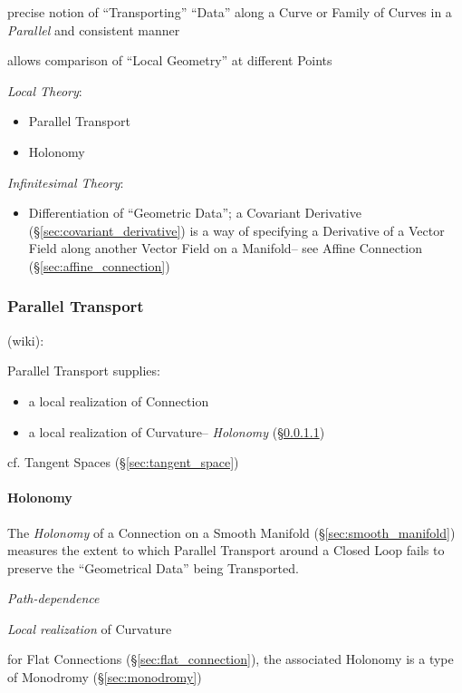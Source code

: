 \begin{itemize}
precise notion of ``Transporting'' ``Data'' along a Curve or Family of Curves
in a \emph{Parallel} and consistent manner

allows comparison of ``Local Geometry'' at different Points

\emph{Local Theory}:
\begin{itemize}
  \item Parallel Transport
  \item Holonomy
\end{itemize}

\emph{Infinitesimal Theory}:
\begin{itemize}
  \item Differentiation of ``Geometric Data''; a Covariant Derivative
    (\S\ref{sec:covariant_derivative}) is a way of specifying a Derivative of a
    Vector Field along another Vector Field on a Manifold-- see Affine
    Connection (\S\ref{sec:affine_connection})
\end{itemize}



\subsubsection{Parallel Transport}\label{sec:parallel_transport}

(wiki):

Parallel Transport supplies:
\begin{itemize}
  \item a local realization of Connection
  \item a local realization of Curvature-- \emph{Holonomy}
    (\S\ref{sec:holonomy})
\end{itemize}

\fist cf. Tangent Spaces (\S\ref{sec:tangent_space})



\paragraph{Holonomy}\label{sec:holonomy}\hfill

The \emph{Holonomy} of a Connection on a Smooth Manifold
(\S\ref{sec:smooth_manifold}) measures the extent to which Parallel Transport
around a Closed Loop fails to preserve the ``Geometrical Data'' being
Transported.

\emph{Path-dependence}

\emph{Local realization} of Curvature

for Flat Connections (\S\ref{sec:flat_connection}), the associated Holonomy is
a type of Monodromy (\S\ref{sec:monodromy})


\end{itemize}
